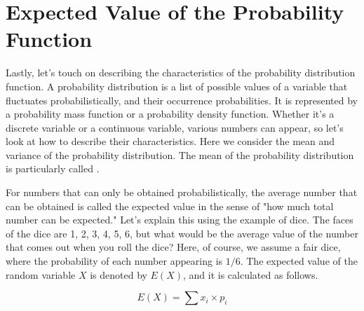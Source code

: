 \section{Expected Value of the Probability Function}
\label{expectation}
Lastly, let's touch on describing the characteristics of the probability distribution function.
A probability distribution is a list of possible values of a variable that fluctuates probabilistically, and their occurrence probabilities. It is represented by a probability mass function or a probability density function.
Whether it's a discrete variable or a continuous variable, various numbers can appear, so let's look at how to describe their characteristics.
Here we consider the mean and variance of the probability distribution. The mean of the probability distribution is particularly called .

For numbers that can only be obtained probabilistically, the average number that can be obtained is called the expected value in the sense of "how much total number can be expected."
Let's explain this using the example of dice. The faces of the dice are 1, 2, 3, 4, 5, 6, but what would be the average value of the number that comes out when you roll the dice? Here, of course, we assume a fair dice, where the probability of each number appearing is $1/6$.
The expected value of the random variable $X$ is denoted by $E(X)$, and it is calculated as follows.

\[ E(X) = \sum x_i \times p_i \]

